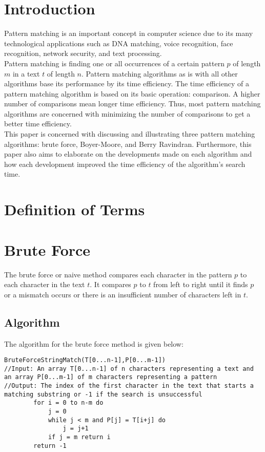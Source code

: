 \section{Introduction}
 Pattern matching is an important concept in computer science due to its many technological applications such as DNA matching, voice recognition, face recognition, network security, and text processing.\cite{fsw}
\\
Pattern matching is finding one or all occurrences of a certain pattern $p$ of length $m$ in a text $t$ of length $n$. Pattern matching algorithms as is with all other algorithms base its performance by its time efficiency. The time efficiency of a pattern matching algorithm is based on its basic operation: comparison. A higher number of comparisons mean longer time efficiency. Thus, most pattern matching algorithms are concerned with minimizing the number of comparisons to get a better time efficiency.
\\
This paper is concerned with discussing and illustrating three pattern matching algorithms: brute force, Boyer-Moore, and Berry Ravindran. Furthermore, this paper also aims to elaborate on the developments made on each algorithm and how each development improved the time efficiency of the algorithm's search time.
\section{Definition of Terms}

\section{Brute Force}
The brute force or naive method compares each character in the pattern $p$ to each character in the text $t$. It compares $p$ to $t$ from left to right until it finds $p$ or a mismatch occurs or there is an insufficient number of characters left in $t$. 
\subsection{Algorithm}
The algorithm for the brute force method is given below:
\begin{lstlisting}
BruteForceStringMatch(T[0...n-1],P[0...m-1])
//Input: An array T[0...n-1] of n characters representing a text and an array P[0...m-1] of m characters representing a pattern
//Output: The index of the first character in the text that starts a matching substring or -1 if the search is unsuccessful
		for i = 0 to n-m do
			j = 0
			while j < m and P[j] = T[i+j] do
				j = j+1
			if j = m return i
		return -1 
\end{lstlisting} 
